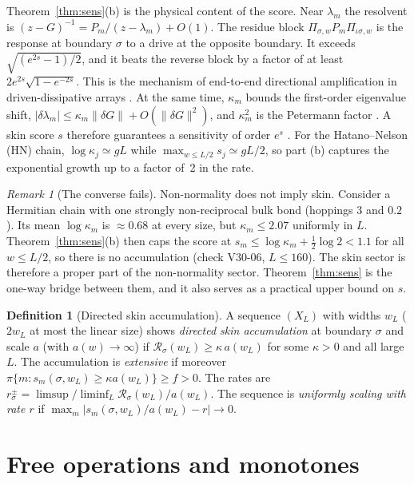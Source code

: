 \documentclass[11pt]{article}
\theoremstyle{definition}
\newtheorem{definition}{Definition}
\theoremstyle{remark}
\newtheorem{remark}{Remark}
\newcommand{\isig}{\iota\sigma}
\begin{document}
Theorem~\ref{thm:sens}(b) is the physical content of the score. Near $\lambda_m$ the resolvent is $(z-G)^{-1}=P_m/(z-\lambda_m)+O(1)$. The residue block $\Pi_{\sigma,w}P_m\Pi_{\isig,w}$ is the response at boundary $\sigma$ to a drive at the opposite boundary. It exceeds $\sqrt{(e^{2s}-1)/2}$, and it beats the reverse block by a factor of at least $2e^{2s}\sqrt{1-e^{-2s}}$. This is the mechanism of end-to-end directional amplification in driven-dissipative arrays \cite{Por19,WBN20}. At the same time, $\kappa_m$ bounds the first-order eigenvalue shift, $|\delta\lambda_m|\le\kappa_m\|\delta G\|+O(\|\delta G\|^2)$, and $\kappa_m^2$ is the Petermann factor \cite{Pet79}. A skin score $s$ therefore guarantees a sensitivity of order $e^{s}$ \cite{BB20}. For the Hatano--Nelson (HN) chain, $\log\kappa_j\simeq gL$ while $\max_{w\le L/2}s_j\simeq gL/2$, so part (b) captures the exponential growth up to a factor of~2 in the rate.

\begin{remark}[The converse fails]\label{rem:converse}
Non-normality does not imply skin. Consider a Hermitian chain with one strongly non-reciprocal bulk bond (hoppings $3$ and $0.2$). Its mean $\log\kappa_m$ is $\approx0.68$ at every size, but $\kappa_m\le2.07$ uniformly in $L$. Theorem~\ref{thm:sens}(b) then caps the score at $s_m\le\log\kappa_m+\frac12\log2<1.1$ for all $w\le L/2$, so there is no accumulation (check V30-06, $L\le160$). The skin sector is therefore a proper part of the non-normality sector. Theorem~\ref{thm:sens} is the one-way bridge between them, and it also serves as a practical upper bound on $s$.
\end{remark}

\begin{definition}[Directed skin accumulation]\label{def:phys}
A sequence $(X_L)$ with widths $w_L$ ($2w_L$ at most the linear size) shows \emph{directed skin accumulation} at boundary $\sigma$ and scale $a$ (with $a(w)\to\infty$) if $\mathcal R_\sigma(w_L)\ge\kappa\,a(w_L)$ for some $\kappa>0$ and all large $L$. The accumulation is \emph{extensive} if moreover $\pi\{m:s_m(\sigma,w_L)\ge\kappa a(w_L)\}\ge f>0$. The rates are $r^\pm_\sigma=\limsup/\liminf_L\mathcal R_\sigma(w_L)/a(w_L)$. The sequence is \emph{uniformly scaling with rate $r$} if $\max_m|s_m(\sigma,w_L)/a(w_L)-r|\to0$.
\end{definition}

\section{Free operations and monotones}
\label{sec:rt}
\end{document}
